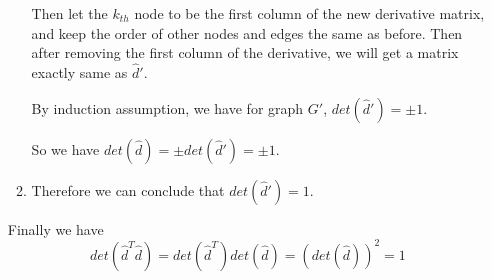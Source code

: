 \documentclass[twoside,11pt]{homework}
\begin{document}
\begin{enumerate}
\begin{enumerate}
        Then let the $k_{th}$ node to be the first column of the new derivative matrix, and keep the order of other nodes and edges the same as before. Then after removing the first column of the derivative, we will get a matrix exactly same as $\hat{d}'$.
        
        By induction assumption, we have for graph $G'$, $det(\hat{d}')=\pm 1$. 
        
        So we have $det(\hat{d}) = \pm det(\hat{d}') = \pm 1$.
        \item
        Therefore we can conclude that $det(\hat{d}')=1$.
        
    \end{enumerate}
    
    Finally we have
    $$det(\hat{d}^T\hat{d}) = det(\hat{d}^T)det(\hat{d}) =(det(\hat{d}))^{2} = 1$$

    
    

\end{enumerate}
\end{document}
